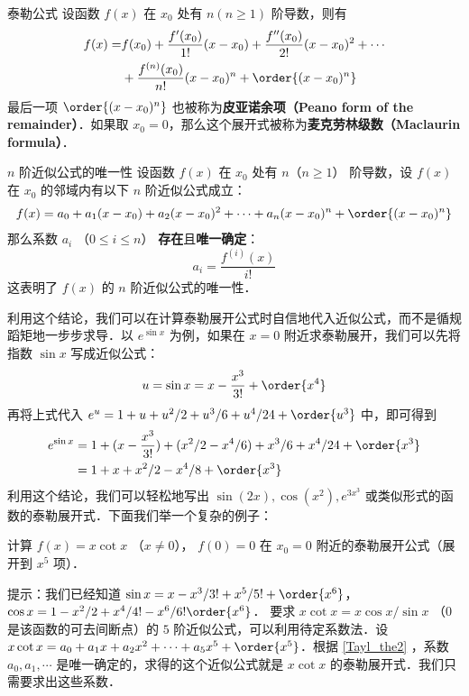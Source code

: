 
\begin{theorem}{泰勒公式}\label{Tayl_the1}
设函数 $f(x)$ 在 $x_0$ 处有 $n(n\ge 1)$ 阶导数，则有
\begin{equation}\label{Tayl_eq2}
\begin{aligned}
f(x)=&f(x_0)+\frac{f'(x_0)}{1!}(x-x_0)+\frac{f''(x_0)}{2!}(x-x_0)^2+\cdots\\
&+\frac{f^{(n)}(x_0)}{n!}(x-x_0)^n+\order{(x-x_0)^n}
\end{aligned}
\end{equation}
最后一项 $\order{(x-x_0)^n}$ 也被称为\textbf{皮亚诺余项（Peano form of the remainder）}．如果取 $x_0=0$，那么这个展开式被称为\textbf{麦克劳林级数（Maclaurin formula）}．
\end{theorem}
\begin{theorem}{$n$ 阶近似公式的唯一性}\label{Tayl_the2}
设函数 $f(x)$ 在 $x_0$ 处有 $n$（$n\ge 1$） 阶导数，设 $f(x)$ 在 $x_0$ 的邻域内有以下 $n$ 阶近似公式成立：
\begin{equation}
\begin{aligned}
f(x)=a_0+a_1(x-x_0)+a_2(x-x_0)^2+\cdots+a_n(x-x_0)^n+\order{(x-x_0)^n}
\end{aligned}
\end{equation}
那么系数 $a_i$ （$0\le i\le n$） \textbf{存在}且\textbf{唯一确定}：
\begin{equation}
a_i=\frac{f^{(i)}(x)}{i!}
\end{equation}
这表明了 $f(x)$ 的 $n$ 阶近似公式的唯一性．
\end{theorem}
利用这个结论，我们可以在计算泰勒展开公式时自信地代入近似公式，而不是循规蹈矩地一步步求导．以 $e^{\sin x}$ 为例，如果在 $x=0$ 附近求泰勒展开，我们可以先将指数 $\sin x$ 写成近似公式：
\begin{equation}
u=\sin x=x-\frac{x^3}{3!}+\order{x^4}
\end{equation}
再将上式代入 $e^u=1+u+u^2/2+u^3/6+u^4/24+\order{u^3}$ 中，即可得到
\begin{equation}
\begin{aligned}
e^{\sin x}&=1+(x-\frac{x^3}{3!})+(x^2/2-x^4/6)+x^3/6+x^4/24+\order{x^3}
\\&=1+x+x^2/2-x^4/8+\order{x^3}
\end{aligned}
\end{equation}
利用这个结论，我们可以轻松地写出 $\sin (2x),\cos(x^2),e^{3x^3}$ 或类似形式的函数的泰勒展开式．下面我们举一个复杂的例子：
\begin{exercise}{}
计算 $f(x)=x\cot x$ （$x\neq 0$）， $f(0)=0$ 在 $x_0=0$ 附近的泰勒展开公式（展开到 $x^5$ 项）．
\end{exercise}
提示：我们已经知道 $\sin x=x-x^3/3!+x^5/5!+\order{x^6}$， $\cos x=1-x^2/2+x^4/4!-x^6/6!\order{x^6}$． 要求 $x\cot x=x\cos x/\sin x$ （$0$ 是该函数的可去间断点）的 $5$ 阶近似公式，可以利用待定系数法．设 $x\cot x=a_0+a_1 x+a_2 x^2+\cdots+ a_5 x^5 + \order{x^5}$．根据 \autoref{Tayl_the2}  ，系数 $a_0,a_1,\cdots$ 是唯一确定的，求得的这个近似公式就是 $x\cot x$ 的泰勒展开式．我们只需要求出这些系数．

